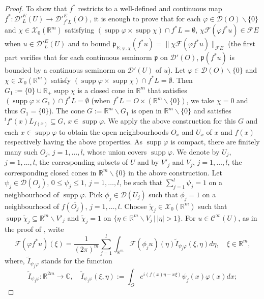 \documentclass[12pt,reqno]{amsart}
\newcommand{\CC}{\mathbb C}
\newcommand{\RR}{\mathbb R}
\newcommand{\DD}{\mathcal D}
\newcommand{\XX}{\mathcal X}
\newcommand{\supp}{\operatorname{supp}}
\theoremstyle{plain}
\theoremstyle{remark}
\theoremstyle{definition}
\numberwithin{equation}{section}
\begin{document}
\begin{proof}
\indent To show that $f^*$ restricts to a well-defined and continuous map $f^*:\DD'^E_L(U)\rightarrow \DD'^E_{f^*L}(O)$, it is enough to prove that for each $\varphi\in \DD(O)\backslash\{0\}$ and $\chi\in\XX_0(\RR^m)$ satisfying $(\supp\varphi\times\supp\chi)\cap f^*L=\emptyset$, $\chi\mathcal{F}(\varphi f^*u)\in\mathcal{F}E$ when $u\in\DD'^E_L(U)$ and to bound $\mathfrak{p}_{E;\varphi,\chi}(f^*u)=\|\chi\mathcal{F}(\varphi f^*u)\|_{\mathcal{F}E}$ (the first part verifies that for each continuous seminorm $\mathfrak{p}$ on $\DD'(O)$, $\mathfrak{p}(f^*u)$ is bounded by a continuous seminorm on $\DD'(U)$ of $u$). Let $\varphi\in \DD(O)\backslash\{0\}$ and $\chi\in\XX_0(\RR^m)$ satisfy $(\supp\varphi\times\supp\chi)\cap f^*L=\emptyset$. Then $G_1:=\{0\}\cup\RR_+\supp\chi$ is a closed cone in $\RR^m$ that satisfies $(\supp\varphi\times G_1)\cap f^*L=\emptyset$ (when $f^*L=O\times(\RR^m\backslash\{0\})$, we take $\chi=0$ and thus $G_1=\{0\}$). The cone $G:=\RR^m\backslash G_1$ is open in $\RR^m\backslash\{0\}$ and satisfies ${}^tf'(x)L_{f(x)}\subseteq G$, $x\in\supp\varphi$. We apply the above construction for this $G$ and each $x\in \supp\varphi$ to obtain the open neighbourhoods $O_x$ and $U_x$ of $x$ and $f(x)$ respectively having the above properties. As $\supp\varphi$ is compact, there are finitely many such $O_j$, $j=1,\ldots,l$, whose union covers $\supp\varphi$. We denote by $U_j$, $j=1,\ldots,l$, the corresponding subsets of $U$ and by $V'_j$ and $V_j$, $j=1,\ldots,l$, the corresponding closed cones in $\RR^m\backslash\{0\}$ in the above construction. Let $\psi_j\in\DD(O_j)$, $0\leq \psi_j\leq 1$, $j=1,\ldots, l$, be such that $\sum_{j=1}^l\psi_j=1$ on a neighbourhood of $\supp\varphi$. Pick $\phi_j\in\DD(U_j)$ such that $\phi_j=1$ on a neighbourhood of $f(\overline{O_j})$, $j=1,\ldots,l$. Choose $\widetilde{\chi}_j\in\XX_0(\RR^m)$ such that $\supp\widetilde{\chi}_j\subseteq \RR^m\backslash V'_j$ and $\widetilde{\chi}_j=1$ on $\{\eta\in\RR^m\backslash V_j\,|\, |\eta|>1\}$. For $u\in\mathcal{C}^{\infty}(U)$, as in the proof of \cite[Theorem 3.21]{PP}, write
\begin{equation}\label{ide-for-fourtransofpbfks}
\mathcal{F}(\varphi f^*u)(\xi)=\frac{1}{(2\pi)^m}\sum_{j=1}^l\int_{\RR^m}\mathcal{F}(\phi_j u)(\eta)\widetilde{I}_{\psi_j\varphi}(\xi,\eta)d\eta,\quad \xi\in\RR^m,
\end{equation}
where, $\widetilde{I}_{\psi_j\varphi}$ stands for the function
\begin{equation*}
\widetilde{I}_{\psi_j\varphi}:\RR^{2m}\rightarrow \CC,\quad \widetilde{I}_{\psi_j\varphi}(\xi,\eta):=\int_O e^{i (f(x)\eta-x\xi)} \psi_j(x)\varphi(x)dx;

\end{equation*}
\end{proof}
\end{document}
